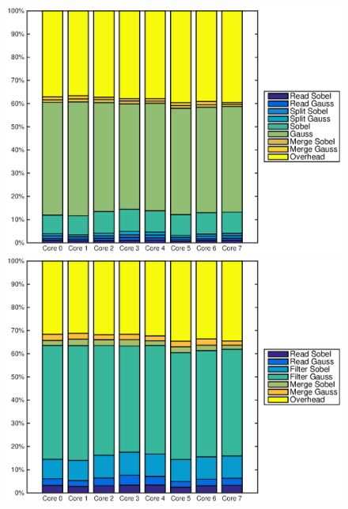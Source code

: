 \begin{figure}
    \centering
    \begin{minipage}{0.45\textwidth}
        \centering
        \includegraphics[width=0.99\linewidth]{images/openem_cifcif_4initial_func.eps}
    \end{minipage}
    \hfill
    \begin{minipage}{0.45\textwidth}
        \centering
        \includegraphics[width=0.99\linewidth]{images/openem_cifcif_4initial_eo.eps}
    \end{minipage}%
\end{figure}
